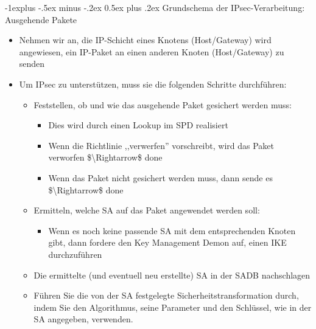 \documentclass[a4paper]{article}
\makeatletter
\renewcommand{\subsection}{\@startsection{subsection}{2}{0mm}%
 {-1explus -.5ex minus -.2ex}%
 {0.5ex plus .2ex}%
 {\normalfont\normalsize\bfseries}}
\makeatother
\begin{document}
\begin{multicols}{3}
    \subsection{Grundschema der IPsec-Verarbeitung: Ausgehende
        Pakete}

    \begin{itemize}
        \item
              Nehmen wir an, die IP-Schicht eines Knotens (Host/Gateway) wird
              angewiesen, ein IP-Paket an einen anderen Knoten (Host/Gateway) zu
              senden
        \item
              Um IPsec zu unterstützen, muss sie die folgenden Schritte durchführen:

              \begin{itemize}
                  \item
                        Feststellen, ob und wie das ausgehende Paket gesichert werden muss:

                        \begin{itemize}
                            \item
                                  Dies wird durch einen Lookup im SPD realisiert
                            \item
                                  Wenn die Richtlinie ,,verwerfen'' vorschreibt, wird das Paket
                                  verworfen \$\textbackslash Rightarrow\$ done
                            \item
                                  Wenn das Paket nicht gesichert werden muss, dann sende es
                                  \$\textbackslash Rightarrow\$ done
                        \end{itemize}
                  \item
                        Ermitteln, welche SA auf das Paket angewendet werden soll:

                        \begin{itemize}
                            \item
                                  Wenn es noch keine passende SA mit dem entsprechenden Knoten gibt,
                                  dann fordere den Key Management Demon auf, einen IKE durchzuführen
                        \end{itemize}
                  \item
                        Die ermittelte (und eventuell neu erstellte) SA in der SADB
                        nachschlagen
                  \item
                        Führen Sie die von der SA festgelegte Sicherheitstransformation
                        durch, indem Sie den Algorithmus, seine Parameter und den Schlüssel,
                        wie in der SA angegeben, verwenden.


\end{itemize}
\end{itemize}
\end{multicols}
\end{document}
